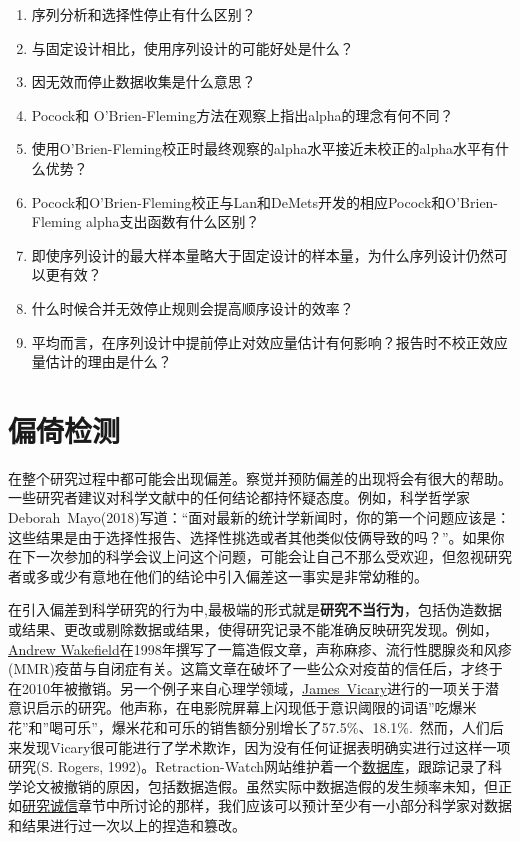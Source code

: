 \documentclass[
  letterpaper,
  DIV=11,
  numbers=noendperiod]{scrreprt}
\begin{document}
\begin{enumerate}
\def\labelenumi{\arabic{enumi}.}
\item
  序列分析和选择性停止有什么区别？
\item
  与固定设计相比，使用序列设计的可能好处是什么？
\item
  因无效而停止数据收集是什么意思？
\item
  Pocock和 O'Brien-Fleming方法在观察上指出alpha的理念有何不同？
\item
  使用O'Brien-Fleming校正时最终观察的alpha水平接近未校正的alpha水平有什么优势？
\item
  Pocock和O'Brien-Fleming校正与Lan和DeMets开发的相应Pocock和O'Brien-Fleming
  alpha支出函数有什么区别？
\item
  即使序列设计的最大样本量略大于固定设计的样本量，为什么序列设计仍然可以更有效？
\item
  什么时候合并无效停止规则会提高顺序设计的效率？
\item
  平均而言，在序列设计中提前停止对效应量估计有何影响？报告时不校正效应量估计的理由是什么？
\end{enumerate}


\hypertarget{sec-bias}{%
\chapter{偏倚检测}\label{sec-bias}}

在整个研究过程中都可能会出现偏差。察觉并预防偏差的出现将会有很大的帮助。一些研究者建议对科学文献中的任何结论都持怀疑态度。例如，科学哲学家Deborah~Mayo(2018)写道：``面对最新的统计学新闻时，你的第一个问题应该是：这些结果是由于选择性报告、选择性挑选或者其他类似伎俩导致的吗？''。如果你在下一次参加的科学会议上问这个问题，可能会让自己不那么受欢迎，但忽视研究者或多或少有意地在他们的结论中引入偏差这一事实是非常幼稚的。

在引入偏差到科学研究的行为中,最极端的形式就是\textbf{研究不当行为}，包括伪造数据或结果、更改或剔除数据或结果，使得研究记录不能准确反映研究发现。例如，\href{https://en.wikipedia.org/wiki/Andrew_Wakefield}{Andrew
Wakefield}在1998年撰写了一篇造假文章，声称麻疹、流行性腮腺炎和风疹(MMR)疫苗与自闭症有关。这篇文章在破坏了一些公众对疫苗的信任后，才终于在2010年被撤销。另一个例子来自心理学领域，\href{https://en.wikipedia.org/wiki/James_Vicary}{James~Vicary}进行的一项关于潜意识启示的研究。他声称，在电影院屏幕上闪现低于意识阈限的词语''吃爆米花''和''喝可乐''，爆米花和可乐的销售额分别增长了57.5\%、18.1\%.~然而，人们后来发现Vicary很可能进行了学术欺诈，因为没有任何证据表明确实进行过这样一项研究(S.
Rogers,
1992)。Retraction-Watch网站维护着一个\href{http://retractiondatabase.org}{数据库}，跟踪记录了科学论文被撤销的原因，包括数据造假。虽然实际中数据造假的发生频率未知，但正如\protect\hyperlink{integrity}{研究诚信}章节中所讨论的那样，我们应该可以预计至少有一小部分科学家对数据和结果进行过一次以上的捏造和篡改。
\end{document}
